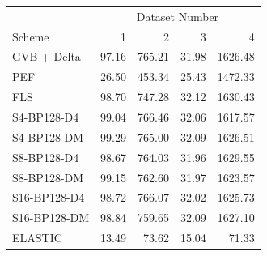 \begin{tabular}{lrrrr}
\toprule
 & \multicolumn{4}{c}{Dataset Number} \\
Scheme & 1 & 2 & 3 & 4 \\
\midrule
GVB + Delta & 97.16 & 765.21 & 31.98 & 1626.48 \\
PEF & 26.50 & 453.34 & 25.43 & 1472.33 \\
FLS & 98.70 & 747.28 & 32.12 & 1630.43 \\
S4-BP128-D4 & 99.04 & 766.46 & 32.06 & 1617.57 \\
S4-BP128-DM & 99.29 & 765.00 & 32.09 & 1626.51 \\
S8-BP128-D4 & 98.67 & 764.03 & 31.96 & 1629.55 \\
S8-BP128-DM & 99.15 & 762.60 & 31.97 & 1623.57 \\
S16-BP128-D4 & 98.72 & 766.07 & 32.02 & 1625.73 \\
S16-BP128-DM & 98.84 & 759.65 & 32.09 & 1627.10 \\
ELASTIC & 13.49 & 73.62 & 15.04 & 71.33 \\
\bottomrule
\end{tabular}
